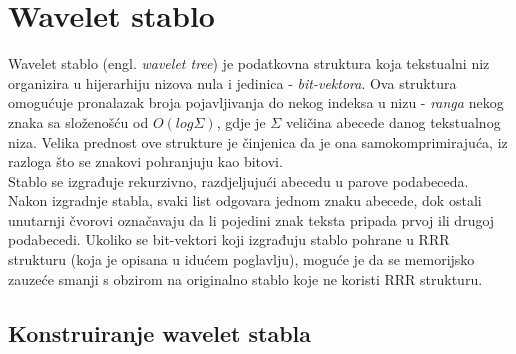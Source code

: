 \section{Wavelet stablo}

Wavelet stablo (engl. \textit{wavelet tree}) je podatkovna struktura koja tekstualni niz organizira u hijerarhiju nizova nula i jedinica - \textit{bit-vektora}. Ova struktura omogućuje pronalazak broja pojavljivanja do nekog indeksa u nizu - \textit{ranga} nekog znaka sa složenošću od $O(log \Sigma)$, gdje je $\Sigma$ veličina abecede danog tekstualnog niza. Velika prednost ove strukture je činjenica da je ona samokomprimirajuća, iz razloga što se znakovi pohranjuju kao bitovi.\\
Stablo se izgrađuje rekurzivno, razdjeljujući abecedu u parove podabeceda. Nakon izgradnje stabla, svaki list odgovara jednom znaku abecede, dok ostali unutarnji čvorovi označavaju da li pojedini znak teksta pripada prvoj ili drugoj podabecedi.
Ukoliko se bit-vektori koji izgrađuju stablo pohrane u RRR strukturu (koja je opisana u idućem poglavlju), moguće je da se memorijsko zauzeće smanji s obzirom na originalno stablo koje ne koristi RRR strukturu.


\subsection{Konstruiranje wavelet stabla}

